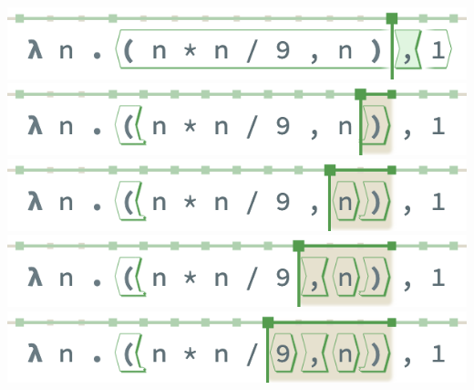 \noindent
\begin{minipage}[t]{0.495\columnwidth}
  \includegraphics[width=\textwidth]{img/selection-0.png}
  \includegraphics[width=\textwidth]{img/selection-1.png}
  \includegraphics[width=\textwidth]{img/selection-2.png}
  \includegraphics[width=\textwidth]{img/selection-3.png}
  \includegraphics[width=\textwidth]{img/selection-4.png}
\end{minipage}
\hfill
